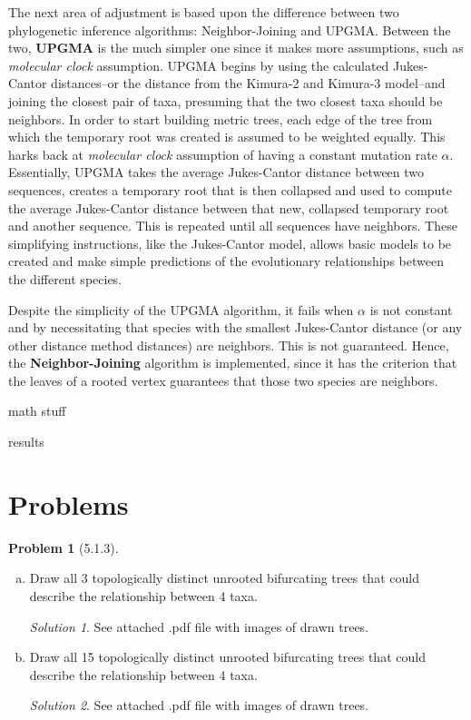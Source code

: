 \documentclass[11pt]{article}
\theoremstyle{definition}\newtheorem*{problem}{Problem}
\theoremstyle{remark}\newtheorem{claim}{Claim}
\theoremstyle{remark}\newtheorem*{sol}{Solution}
\begin{document}
\par The next area of adjustment is based upon the difference between two phylogenetic inference algorithms: Neighbor-Joining and UPGMA. Between the two, \textbf{UPGMA} is the much simpler one since it makes more assumptions, such as \textit{molecular clock} assumption. UPGMA begins by using the calculated Jukes-Cantor distances--or the distance from the Kimura-2 and Kimura-3 model--and joining the closest pair of taxa, presuming that the two closest taxa should be neighbors. In order to start building metric trees, each edge of the tree from which the temporary root was created is assumed to be weighted equally. This harks back at \textit{molecular clock} assumption of having a constant mutation rate $\alpha$.  Essentially, UPGMA takes the average Jukes-Cantor distance between two sequences, creates a temporary root that is then collapsed and used to compute the average Jukes-Cantor distance between that new, collapsed temporary root and another sequence. This is repeated until all sequences have neighbors. These simplifying instructions, like the Jukes-Cantor model, allows basic models to be created and make simple predictions of the evolutionary relationships between the different species.

\par Despite the simplicity of the UPGMA algorithm, it fails when $\alpha$ is not constant and by necessitating that species with the smallest Jukes-Cantor distance (or any other distance method distances) are neighbors. This is not guaranteed. Hence, the \textbf{Neighbor-Joining} algorithm is implemented, since it has the criterion that the leaves of a rooted vertex guarantees that those two species are neighbors.


\par math stuff

\par results

\section{Problems}

\begin{problem}[5.1.3] 
\end{problem}
\begin{enumerate}[a.]

\item Draw all 3 topologically distinct unrooted bifurcating trees that could describe the relationship between 4 taxa.
\begin{sol} 
See attached .pdf file with images of drawn trees. 
\end{sol}

\item Draw all 15 topologically distinct unrooted bifurcating trees that could describe the relationship between 4 taxa.
\begin{sol}
See attached .pdf file with images of drawn trees.
\end{sol}


\end{enumerate}
\end{document}

